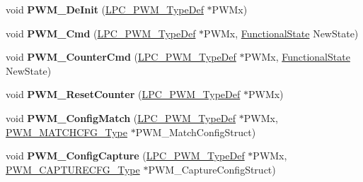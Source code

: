 \begin{DoxyCompactItemize}
\item 
\hypertarget{group___p_w_m___public___functions_ga7d63c1553ef0e8dfe132e85550de501e}{void {\bfseries \-P\-W\-M\-\_\-\-De\-Init} (\hyperlink{struct_l_p_c___p_w_m___type_def}{\-L\-P\-C\-\_\-\-P\-W\-M\-\_\-\-Type\-Def} $\ast$\-P\-W\-Mx)}\label{group___p_w_m___public___functions_ga7d63c1553ef0e8dfe132e85550de501e}

\item 
\hypertarget{group___p_w_m___public___functions_ga324784f12861403b86424167c01b9c08}{void {\bfseries \-P\-W\-M\-\_\-\-Cmd} (\hyperlink{struct_l_p_c___p_w_m___type_def}{\-L\-P\-C\-\_\-\-P\-W\-M\-\_\-\-Type\-Def} $\ast$\-P\-W\-Mx, \hyperlink{group___l_p_c___types___public___types_gac9a7e9a35d2513ec15c3b537aaa4fba1}{\-Functional\-State} \-New\-State)}\label{group___p_w_m___public___functions_ga324784f12861403b86424167c01b9c08}

\item 
\hypertarget{group___p_w_m___public___functions_ga237d47eddfbbf747fd97eaed1e79336c}{void {\bfseries \-P\-W\-M\-\_\-\-Counter\-Cmd} (\hyperlink{struct_l_p_c___p_w_m___type_def}{\-L\-P\-C\-\_\-\-P\-W\-M\-\_\-\-Type\-Def} $\ast$\-P\-W\-Mx, \hyperlink{group___l_p_c___types___public___types_gac9a7e9a35d2513ec15c3b537aaa4fba1}{\-Functional\-State} \-New\-State)}\label{group___p_w_m___public___functions_ga237d47eddfbbf747fd97eaed1e79336c}

\item 
\hypertarget{group___p_w_m___public___functions_ga2c34440e62bdb2030a72b54f66dc6a3f}{void {\bfseries \-P\-W\-M\-\_\-\-Reset\-Counter} (\hyperlink{struct_l_p_c___p_w_m___type_def}{\-L\-P\-C\-\_\-\-P\-W\-M\-\_\-\-Type\-Def} $\ast$\-P\-W\-Mx)}\label{group___p_w_m___public___functions_ga2c34440e62bdb2030a72b54f66dc6a3f}

\item 
\hypertarget{group___p_w_m___public___functions_gac2a214e55fe2994251eae4efcad1ba81}{void {\bfseries \-P\-W\-M\-\_\-\-Config\-Match} (\hyperlink{struct_l_p_c___p_w_m___type_def}{\-L\-P\-C\-\_\-\-P\-W\-M\-\_\-\-Type\-Def} $\ast$\-P\-W\-Mx, \hyperlink{struct_p_w_m___m_a_t_c_h_c_f_g___type}{\-P\-W\-M\-\_\-\-M\-A\-T\-C\-H\-C\-F\-G\-\_\-\-Type} $\ast$\-P\-W\-M\-\_\-\-Match\-Config\-Struct)}\label{group___p_w_m___public___functions_gac2a214e55fe2994251eae4efcad1ba81}

\item 
\hypertarget{group___p_w_m___public___functions_ga1104b98155eac78df781c4724e62ca27}{void {\bfseries \-P\-W\-M\-\_\-\-Config\-Capture} (\hyperlink{struct_l_p_c___p_w_m___type_def}{\-L\-P\-C\-\_\-\-P\-W\-M\-\_\-\-Type\-Def} $\ast$\-P\-W\-Mx, \hyperlink{struct_p_w_m___c_a_p_t_u_r_e_c_f_g___type}{\-P\-W\-M\-\_\-\-C\-A\-P\-T\-U\-R\-E\-C\-F\-G\-\_\-\-Type} $\ast$\-P\-W\-M\-\_\-\-Capture\-Config\-Struct)}\label{group___p_w_m___public___functions_ga1104b98155eac78df781c4724e62ca27}


\end{DoxyCompactItemize}
